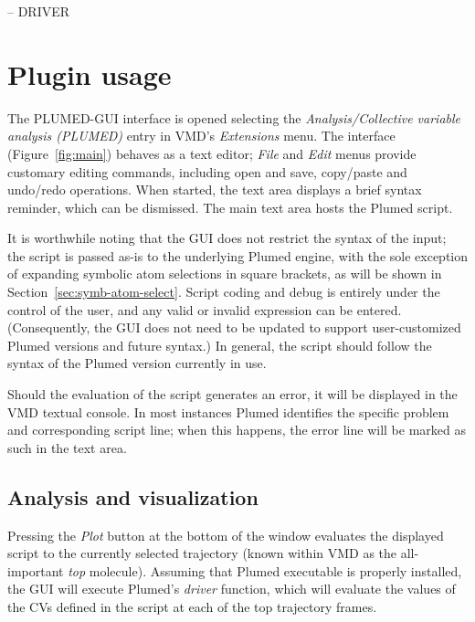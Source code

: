\documentclass[preprint,12pt]{elsarticle}
\begin{document}
-- DRIVER


\section{Plugin usage}

The PLUMED-GUI interface is opened selecting the
\emph{Analysis/Collective variable analysis (PLUMED)} entry in VMD's
\emph{Extensions} menu.  The interface (Figure~\ref{fig:main}) behaves
as a text editor; \emph{File} and \emph{Edit} menus provide customary
editing commands, including open and save, copy/paste and undo/redo
operations. When started, the text area displays a brief syntax
reminder, which can be dismissed.  The main text area hosts
the Plumed script.


It is worthwhile noting that the GUI does not restrict the syntax of
the input; the script is passed as-is to the underlying Plumed engine,
with the sole exception of expanding symbolic atom selections in
square brackets, as will be shown in
Section~\ref{sec:symb-atom-select}.  Script coding and debug is
entirely under the control of the user, and any valid or invalid
expression can be entered.  (Consequently, the GUI does not need to be
updated to support user-customized Plumed versions and future syntax.)
In general, the script should follow the syntax of the Plumed version
currently in use.

Should the evaluation of the script generates an error, it will be
displayed in the VMD textual console.  In most instances Plumed
identifies the specific problem and corresponding script line; when this
happens, the error line will be marked as such
in the text area.



\subsection{Analysis and visualization}

Pressing the \emph{Plot} button at the bottom of the window evaluates
the displayed script to the currently selected trajectory (known
within VMD as the all-important \emph{top} molecule). Assuming that
Plumed executable is properly installed, the GUI will execute Plumed's
\emph{driver} function, which will evaluate the values of the CVs
defined in the script at each of the top trajectory frames.
\end{document}
